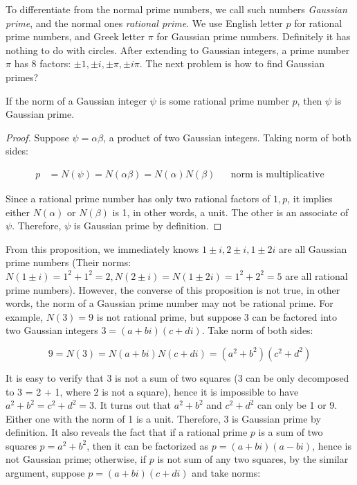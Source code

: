 \documentclass[b5paper]{article}
\begin{document}
 
To differentiate from the normal prime numbers, we call such numbers \emph{Gaussian prime}, and the normal ones \emph{rational prime}. We use English letter $p$ for rational prime numbers, and Greek letter $\pi$ for Gaussian prime numbers. Definitely it has nothing to do with circles. After extending to Gaussian integers, a prime number $\pi$ has 8 factors: $\pm 1, \pm i, \pm \pi, \pm i\pi$. The next problem is how to find Gaussian primes?

\begin{proposition}\label{thm:prime-norm}
If the norm of a Gaussian integer $\psi$ is some rational prime number $p$, then $\psi$ is Gaussian prime.
\end{proposition}

\begin{proof}
Suppose $\psi = \alpha\beta$, a product of two Gaussian integers. Taking norm of both sides:

\begin{align*}
p &= N(\psi) = N(\alpha\beta) = N(\alpha)N(\beta)  && \text{norm is multiplicative}
\end{align*}

Since a rational prime number has only two rational factors of $1, p$, it implies either $N(\alpha)$ or $N(\beta)$ is 1, in other words, a unit. The other is an associate of $\psi$. Therefore, $\psi$ is Gaussian prime by definition.
\end{proof}

From this proposition, we immediately knows $1 \pm i, 2 \pm i, 1 \pm 2i$ are all Gaussian prime numbers (Their norms: $N(1 \pm i) = 1^2 + 1^2 = 2, N(2 \pm i) = N(1 \pm 2i) = 1^2 + 2^2 = 5$ are all rational prime numbers). However, the converse of this proposition is not true, in other words, the norm of a Gaussian prime number may not be rational prime. For example, $N(3) = 9$ is not rational prime, but suppose 3 can be factored into two Gaussian integers $3 = (a + bi)(c + di)$. Take norm of both sides:

\[
9 = N(3) = N(a + bi)N(c + di) = (a^2 + b^2)(c^2 + d^2)
\]

It is easy to verify that 3 is not a sum of two squares (3 can be only decomposed to 3 = 2 + 1, where 2 is not a square), hence it is impossible to have $a^2 + b^2 = c^2 + d^2 = 3$. It turns out that $a^2 + b^2$ and $c^2 + d^2$ can only be 1 or 9. Either one with the norm of 1 is a unit. Therefore, 3 is Gaussian prime by definition. It also reveals the fact that if a rational prime $p$ is a sum of two squares $p = a^2 + b^2$, then it can be factorized as $p = (a + bi)(a - bi)$, hence is not Gaussian prime; otherwise, if $p$ is not sum of any two squares, by the similar argument, suppose $p = (a + bi)(c + di)$ and take norms:
\end{document}
